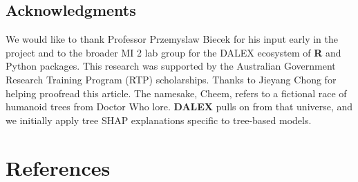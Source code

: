 \documentclass[11pt,twoside]{article}
\begin{document}
\hypertarget{acknowledgments}{%
\subsection*{Acknowledgments}\label{acknowledgments}}

We would like to thank Professor Przemyslaw Biecek for his input early in the project and to the broader MI 2 lab group for the DALEX ecosystem of \textbf{R} and Python packages. This research was supported by the Australian Government Research Training Program (RTP) scholarships. Thanks to Jieyang Chong for helping proofread this article. The namesake, Cheem, refers to a fictional race of humanoid trees from Doctor Who lore. \textbf{DALEX} pulls on from that universe, and we initially apply tree SHAP explanations specific to tree-based models.

\hypertarget{references}{%
\section*{References}\label{references}}
\end{document}
